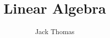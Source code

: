 \documentclass[]{report}
\begin{document}
\title{Linear Algebra}
\author{Jack Thomas}
\date{}

\maketitle
\newpage

\tableofcontents
\newpage
\end{document}
